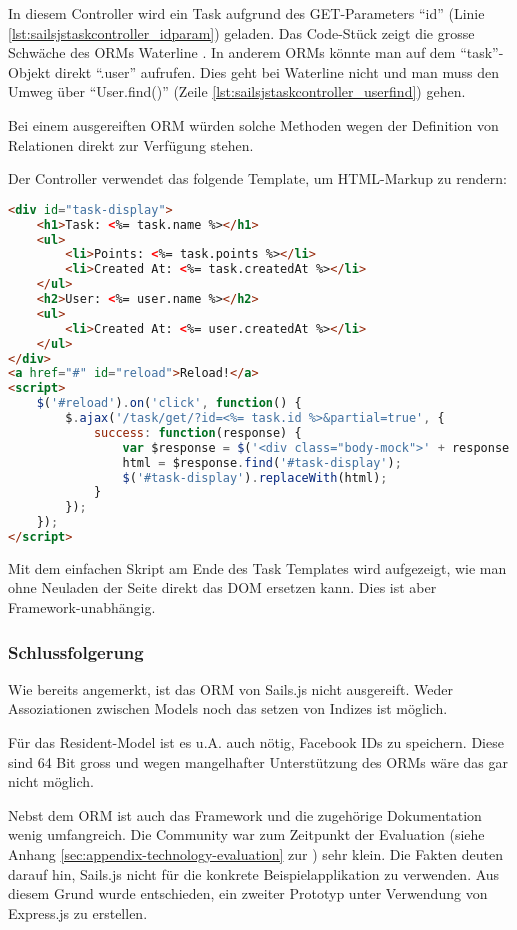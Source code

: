 In diesem Controller wird ein Task aufgrund des GET-Parameters ``id'' (Linie \ref{lst:sailsjstaskcontroller_idparam}) geladen. Das Code-Stück zeigt die grosse Schwäche des ORMs Waterline \cite{Waterline}. In anderem ORMs könnte man auf dem ``task''-Objekt direkt ``.user'' aufrufen. Dies geht bei Waterline nicht und man muss den Umweg über ``User.find()'' (Zeile \ref{lst:sailsjstaskcontroller_userfind}) gehen.

Bei einem ausgereiften ORM würden solche Methoden wegen der Definition von Relationen direkt zur Verfügung stehen.

Der Controller verwendet das folgende Template, um HTML-Markup zu rendern:

\begin{lstlisting}[language=HTML, caption=Task Template]
<div id="task-display">
	<h1>Task: <%= task.name %></h1>
	<ul>
		<li>Points: <%= task.points %></li>
		<li>Created At: <%= task.createdAt %></li>
	</ul>
	<h2>User: <%= user.name %></h2>
	<ul>
		<li>Created At: <%= user.createdAt %></li>
	</ul>
</div>
<a href="#" id="reload">Reload!</a>
<script>
	$('#reload').on('click', function() {
		$.ajax('/task/get/?id=<%= task.id %>&partial=true', {
			success: function(response) {
				var $response = $('<div class="body-mock">' + response + '</div>');
				html = $response.find('#task-display');
				$('#task-display').replaceWith(html);
			}
		});
	});
</script>
\end{lstlisting}

Mit dem einfachen Skript am Ende des Task Templates wird aufgezeigt, wie man ohne Neuladen der Seite direkt das DOM ersetzen kann. Dies ist aber Framework-unabhängig.

\subsubsection*{Schlussfolgerung}

Wie bereits angemerkt, ist das ORM von Sails.js nicht ausgereift. Weder Assoziationen zwischen Models \cite{SailsjsModelAssociations} noch das setzen von Indizes ist möglich.

Für das Resident-Model ist es u.A. auch nötig, Facebook IDs zu speichern. Diese sind 64 Bit gross und wegen mangelhafter Unterstützung des ORMs wäre das gar nicht möglich.

Nebst dem ORM ist auch das Framework und die zugehörige Dokumentation wenig umfangreich. Die Community war zum Zeitpunkt der Evaluation (siehe Anhang \ref{sec:appendix-technology-evaluation} zur ) sehr klein. Die Fakten deuten darauf hin, Sails.js nicht für die konkrete Beispielapplikation zu verwenden. Aus diesem Grund wurde entschieden, ein zweiter Prototyp unter Verwendung von Express.js zu erstellen.